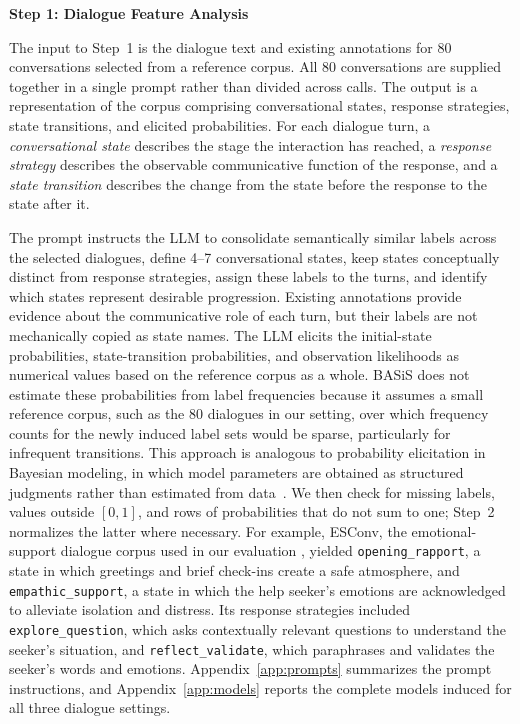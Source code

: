 \documentclass[manuscript,review,anonymous]{acmart}
\begin{document}
\label{mod:feature_analysis}
\noindent\textbf{Step 1: Dialogue Feature Analysis}\par

The input to Step~1 is the dialogue text and existing annotations for 80 conversations selected from a reference corpus. All 80 conversations are supplied together in a single prompt rather than divided across calls. The output is a representation of the corpus comprising conversational states, response strategies, state transitions, and elicited probabilities. For each dialogue turn, a \emph{conversational state} describes the stage the interaction has reached, a \emph{response strategy} describes the observable communicative function of the response, and a \emph{state transition} describes the change from the state before the response to the state after it.

The prompt instructs the LLM to consolidate semantically similar labels across the selected dialogues, define 4--7 conversational states, keep states conceptually distinct from response strategies, assign these labels to the turns, and identify which states represent desirable progression. Existing annotations provide evidence about the communicative role of each turn, but their labels are not mechanically copied as state names. The LLM elicits the initial-state probabilities, state-transition probabilities, and observation likelihoods as numerical values based on the reference corpus as a whole. BASiS does not estimate these probabilities from label frequencies because it assumes a small reference corpus, such as the 80 dialogues in our setting, over which frequency counts for the newly induced label sets would be sparse, particularly for infrequent transitions. This approach is analogous to probability elicitation in Bayesian modeling, in which model parameters are obtained as structured judgments rather than estimated from data~\cite{ohagan2006uncertain,garthwaite2005statistical}. We then check for missing labels, values outside $[0,1]$, and rows of probabilities that do not sum to one; Step~2 normalizes the latter where necessary. For example, ESConv, the emotional-support dialogue corpus used in our evaluation \cite{liu2021esconv}, yielded \texttt{opening\_rapport}, a state in which greetings and brief check-ins create a safe atmosphere, and \texttt{empathic\_support}, a state in which the help seeker's emotions are acknowledged to alleviate isolation and distress. Its response strategies included \texttt{explore\_question}, which asks contextually relevant questions to understand the seeker's situation, and \texttt{reflect\_validate}, which paraphrases and validates the seeker's words and emotions. Appendix~\ref{app:prompts} summarizes the prompt instructions, and Appendix~\ref{app:models} reports the complete models induced for all three dialogue settings.
\end{document}
